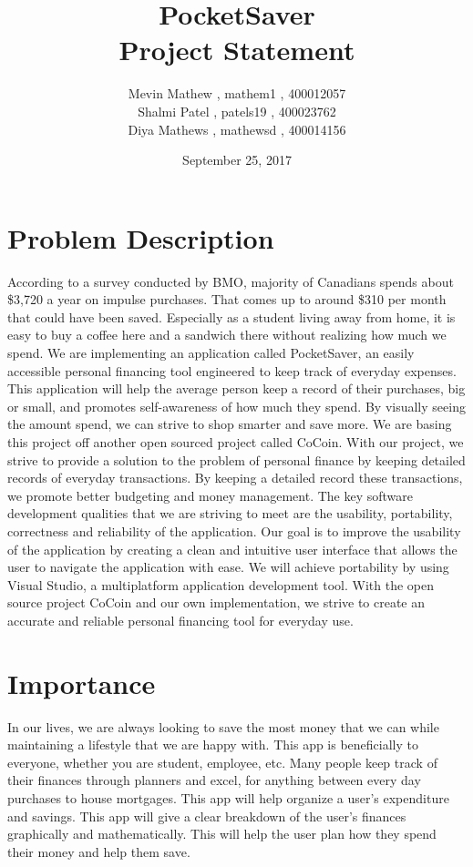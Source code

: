 \documentclass[12pt]{article}
\title{PocketSaver \\ Project Statement}
\author{Mevin Mathew , mathem1 , 400012057 \\ Shalmi Patel , patels19 , 400023762 \\ Diya Mathews , mathewsd , 400014156}
\date{September 25, 2017}
\begin{document}
\maketitle
\newpage
\tableofcontents

\newpage

\section{Problem Description}
According to a survey conducted by BMO, majority of Canadians spends about \$3,720 a year on impulse purchases. That comes up to around \$310 per month that could have been saved. Especially as a student living away from home, it is easy to buy a coffee here and a sandwich there without realizing how much we spend. We are implementing an application called PocketSaver, an easily accessible personal financing tool engineered to keep track of everyday expenses. This application will help the average person keep a record of their purchases, big or small, and promotes self-awareness of how much they spend. By visually seeing the amount spend, we can strive to shop smarter and save more. We are basing this project off another open sourced project called CoCoin. With our project, we strive to provide a solution to the problem of personal finance by keeping detailed records of everyday transactions. By keeping a detailed record these transactions, we promote better budgeting and money management. The key software development qualities that we are striving to meet are the usability, portability, correctness and reliability of the application. Our goal is to improve the usability of the application by creating a clean and intuitive user interface that allows the user to navigate the application with ease. We will achieve portability by using Visual Studio, a multiplatform application development tool. With the open source project CoCoin and our own implementation, we strive to create an accurate and reliable personal financing tool for everyday use.

\section{Importance}
In our lives, we are always looking to save the most money that we can while maintaining a lifestyle that we are happy with. This app is beneficially to everyone, whether you are student, employee, etc. Many people keep track of their finances through planners and excel, for anything between every day purchases to house mortgages. This app will help organize a user’s expenditure and savings. This app will give a clear breakdown of the user’s finances graphically and mathematically. This will help the user plan how they spend their money and help them save. 
\end{document}
